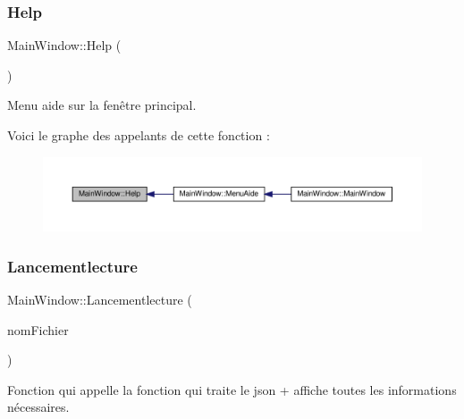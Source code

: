 \subsubsection{\texorpdfstring{Help}{Help}}
{\footnotesize\ttfamily Main\+Window\+::\+Help (\begin{DoxyParamCaption}{ }\end{DoxyParamCaption})\hspace{0.3cm}{\ttfamily [slot]}}



Menu aide sur la fenêtre principal. 

Voici le graphe des appelants de cette fonction \+:
\nopagebreak
\begin{figure}[H]
\begin{center}
\leavevmode
\includegraphics[width=350pt]{class_main_window_a25ec89113c14218717cfade9a58f8fdb_icgraph}
\end{center}
\end{figure}
\mbox{\label{class_main_window_ac368dfd7e2609f0cb72fc1428771aa97}} 
\subsubsection{\texorpdfstring{Lancementlecture}{Lancementlecture}}
{\footnotesize\ttfamily Main\+Window\+::\+Lancementlecture (\begin{DoxyParamCaption}\item[{Q\+String}]{nom\+Fichier }\end{DoxyParamCaption})\hspace{0.3cm}{\ttfamily [slot]}}



Fonction qui appelle la fonction qui traite le json + affiche toutes les informations nécessaires. 


